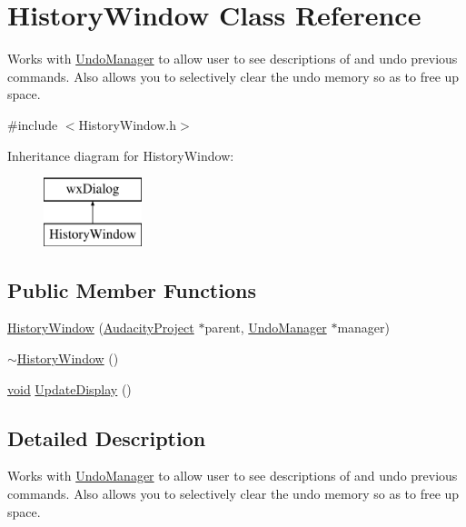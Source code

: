 \hypertarget{class_history_window}{}\section{History\+Window Class Reference}
\label{class_history_window}


Works with \hyperlink{class_undo_manager}{Undo\+Manager} to allow user to see descriptions of and undo previous commands. Also allows you to selectively clear the undo memory so as to free up space.  




{\ttfamily \#include $<$History\+Window.\+h$>$}

Inheritance diagram for History\+Window\+:\begin{figure}[H]
\begin{center}
\leavevmode
\includegraphics[height=2.000000cm]{class_history_window}
\end{center}
\end{figure}
\subsection*{Public Member Functions}
\begin{DoxyCompactItemize}
\item 
\hyperlink{class_history_window_a19a236c4b715e745766484e92a099c6d}{History\+Window} (\hyperlink{class_audacity_project}{Audacity\+Project} $\ast$parent, \hyperlink{class_undo_manager}{Undo\+Manager} $\ast$manager)
\item 
\hyperlink{class_history_window_afc23bcc3cd1a50efa9d26bfafedc44b6}{$\sim$\+History\+Window} ()
\item 
\hyperlink{sound_8c_ae35f5844602719cf66324f4de2a658b3}{void} \hyperlink{class_history_window_a93f79186ef01e829a83d68858ff1140c}{Update\+Display} ()
\end{DoxyCompactItemize}


\subsection{Detailed Description}
Works with \hyperlink{class_undo_manager}{Undo\+Manager} to allow user to see descriptions of and undo previous commands. Also allows you to selectively clear the undo memory so as to free up space. 

